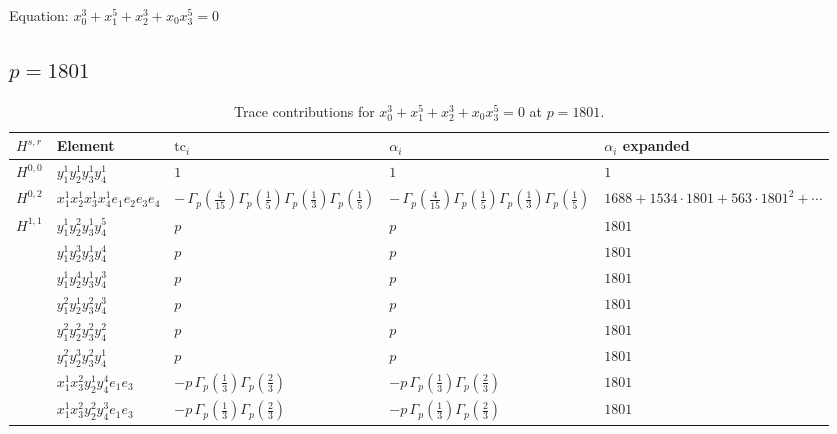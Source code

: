 \documentclass[11pt]{article}
\begin{document}
Equation: $x_0^{3} + x_1^{5} + x_2^{3} + x_0 x_3^{5} = 0$

\subsection*{$p = 1801$}

\begin{table}[ht]
\centering
\caption{Trace contributions for $x_0^{3} + x_1^{5} + x_2^{3} + x_0 x_3^{5} = 0$ at $p=1801$.}\label{tab:deformed-39}
\renewcommand{\arraystretch}{1.1}
{\scriptsize
\begin{tabular}{@{}lllll@{}}
\toprule
$H^{s,r}$ & Element & $\mathrm{tc}_i$ & $\alpha_i$ & $\alpha_i$ expanded \\
\midrule
$H^{0,0}$ & $y_{1}^{1} y_{2}^{1} y_{3}^{1} y_{4}^{1}$ & $1$ & $1$ & $1$ \\
\midrule
$H^{0,2}$ & $x_{1}^{1} x_{2}^{1} x_{3}^{1} x_{4}^{1}  e_{1} e_{2} e_{3} e_{4}$ & $- \, \Gamma_p \left( \frac{4}{15} \right) \Gamma_p \left( \frac{1}{5} \right) \Gamma_p \left( \frac{1}{3} \right) \Gamma_p \left( \frac{1}{5} \right)$ & $- \, \Gamma_p \left( \frac{4}{15} \right) \Gamma_p \left( \frac{1}{5} \right) \Gamma_p \left( \frac{1}{3} \right) \Gamma_p \left( \frac{1}{5} \right)$ & $1688{+}1534{\cdot}1801{+}563{\cdot}1801^{2}{+}\cdots$ \\
\midrule
$H^{1,1}$ & $y_{1}^{1} y_{2}^{2} y_{3}^{1} y_{4}^{5}$ & $p \,$ & $p \,$ & $1801$ \\
 & $y_{1}^{1} y_{2}^{3} y_{3}^{1} y_{4}^{4}$ & $p \,$ & $p \,$ & $1801$ \\
 & $y_{1}^{1} y_{2}^{4} y_{3}^{1} y_{4}^{3}$ & $p \,$ & $p \,$ & $1801$ \\
 & $y_{1}^{2} y_{2}^{1} y_{3}^{2} y_{4}^{3}$ & $p \,$ & $p \,$ & $1801$ \\
 & $y_{1}^{2} y_{2}^{2} y_{3}^{2} y_{4}^{2}$ & $p \,$ & $p \,$ & $1801$ \\
 & $y_{1}^{2} y_{2}^{3} y_{3}^{2} y_{4}^{1}$ & $p \,$ & $p \,$ & $1801$ \\
 & $x_{1}^{1} x_{3}^{2} y_{2}^{1} y_{4}^{4} e_{1} e_{3}$ & $- p \, \Gamma_p \left( \frac{1}{3} \right) \Gamma_p \left( \frac{2}{3} \right)$ & $- p \, \Gamma_p \left( \frac{1}{3} \right) \Gamma_p \left( \frac{2}{3} \right)$ & $1801$ \\
 & $x_{1}^{1} x_{3}^{2} y_{2}^{2} y_{4}^{3} e_{1} e_{3}$ & $- p \, \Gamma_p \left( \frac{1}{3} \right) \Gamma_p \left( \frac{2}{3} \right)$ & $- p \, \Gamma_p \left( \frac{1}{3} \right) \Gamma_p \left( \frac{2}{3} \right)$ & $1801$ \\

\end{tabular}}
\end{table}
\end{document}
